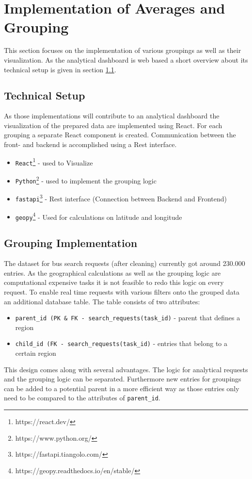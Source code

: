 %
%
% 
% 
% 

\chapter{Implementation of Averages and Grouping}
\label{chap:analytical_dashboard}
This section focuses on the implementation of various groupings as well as their visualization. As the analytical dashboard is web based a short overview about its technical setup is given in section \ref{sec:tech_set}.

\section{Technical Setup}
\label{sec:tech_set}
As those implementations will contribute to an analytical dashboard the visualization of the prepared data are implemented using React. For each grouping a separate React component is created. Communication between the front- and backend is accomplished using a Rest interface. 

\begin{itemize}
\item  \verb|React|\footnote{https://react.dev/} - used to Visualize
\item \verb|Python|\footnote{https://www.python.org/} - used to implement the grouping logic
\item \verb|fastapi|\footnote{https://fastapi.tiangolo.com/} - Rest interface (Connection between Backend and Frontend) 
\item \verb|geopy|\footnote{https://geopy.readthedocs.io/en/stable/} - Used for calculations on latitude and longitude 
\end{itemize}


\section{Grouping Implementation}
The dataset for bus search requests (after cleaning) currently got around 230.000 entries. As the geographical calculations as well as the grouping logic are computational expensive tasks it is not feasible to redo this logic on every request. To enable real time requests with various filters onto the grouped data an additional database table. The table consists of two attributes: 
\begin{itemize}
\item \verb|parent_id (PK & FK - search_requests(task_id)| - parent that defines a region 
\item \verb|child_id (FK - search_requests(task_id)| - entries that belong to a certain region  
\end{itemize}
This design comes along with several advantages. The logic for analytical requests and the grouping logic can be separated. Furthermore new entries for groupings can be added to a potential parent in a more efficient way as those entries only need to be compared to the attributes of \verb|parent_id|.

